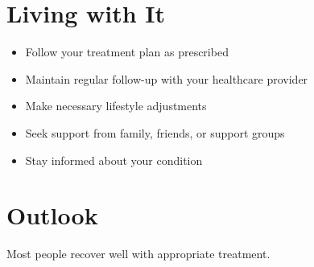 \section{Living with It}
\begin{itemize}[noitemsep]
  \item Follow your treatment plan as prescribed
  \item Maintain regular follow-up with your healthcare provider
  \item Make necessary lifestyle adjustments
  \item Seek support from family, friends, or support groups
  \item Stay informed about your condition
\end{itemize}
\section{Outlook}
Most people recover well with appropriate treatment.
